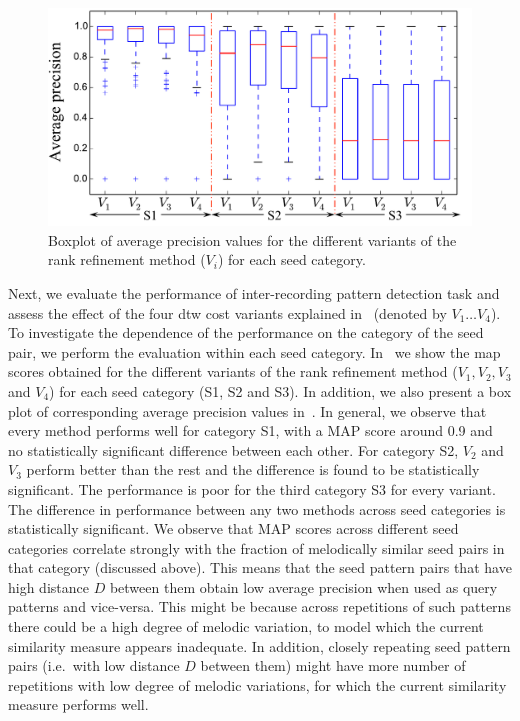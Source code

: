 \begin{figure}
	\begin{center}
		\includegraphics[width=\figSizeHundred]{ch06_patterns/figures/discovery/boxPlot.pdf}
	\end{center}
	\caption{Boxplot of average precision values for the different variants of the rank refinement method ($V_i$) for each seed category. }
	\label{fig:boxPlotMAPPatternDiscovery}
\end{figure}

Next, we evaluate the performance of inter-recording pattern detection task and assess the effect of the four \gls{dtw} cost variants explained in~ (denoted by $V_1 \dots V_4$). To investigate the dependence of the performance on the category of the seed pair, we perform the evaluation within each seed category. In~ we show the \gls{map} scores obtained for the different variants of the rank refinement method ($V_1, V_2, V_3$ and $V_4$) for each seed category (S1, S2 and S3). In addition, we also present a box plot of corresponding average precision values in~. In general, we observe that every method performs well for category S1, with a MAP score around 0.9 and no statistically significant difference between each other. For category S2, $V_2$ and $V_3$ perform better than the rest and the difference is found to be statistically significant. The performance is poor for the third category S3 for every variant. The difference in performance between any two methods across seed categories is statistically significant. We observe that MAP scores across different seed categories correlate strongly with the fraction of melodically similar seed pairs in that category (discussed above). This means that the seed pattern pairs that have high distance $D$ between them obtain low average precision when used as query patterns and vice-versa. This might be because across repetitions of such patterns there could be a high degree of melodic variation, to model which the current similarity measure appears inadequate. In addition, closely repeating seed pattern pairs (i.e.~with low distance $D$ between them) might have more number of repetitions with low degree of melodic variations, for which the current similarity measure performs well. 

